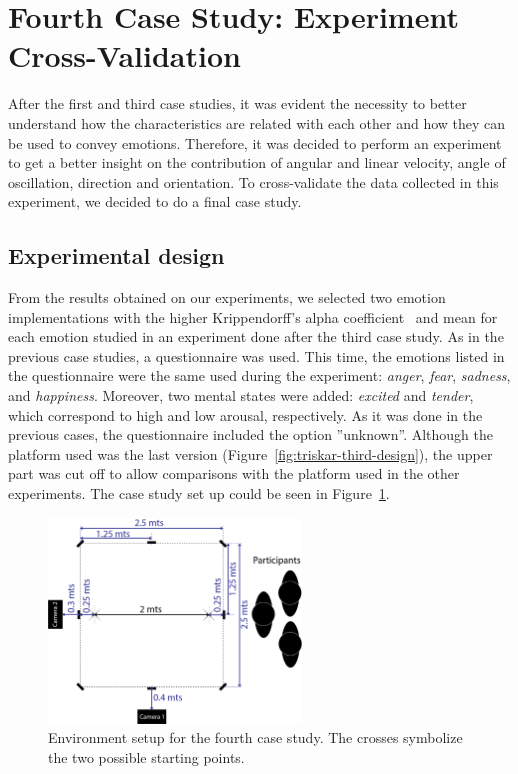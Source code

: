 \section{Fourth Case Study: Experiment Cross-Validation}

After the first and third case studies, it was evident the necessity to better understand how the characteristics are related with each other and how they can be used to convey emotions. Therefore, it was decided to perform an experiment~\cite{Angel2017} to get a better insight on the contribution of angular and linear velocity, angle of oscillation, direction and orientation. To cross-validate the data collected in this experiment, we decided to do a final case study.

\subsection{Experimental design}

From the results obtained on our experiments, we selected two emotion implementations with the higher Krippendorff's alpha coefficient~\cite{Klaus2007} and mean for each emotion studied in an experiment done after the third case study. As in the previous case studies, a questionnaire was used. This time, the emotions listed in the questionnaire were the same used during the experiment: \textit{anger}, \textit{fear}, \textit{sadness}, and \textit{happiness}. Moreover, two mental states were added: \textit{excited} and \textit{tender}, which correspond to high and low arousal, respectively. As it was done in the previous cases, the questionnaire included the option ''unknown''. Although the platform used was the last version (Figure~\ref{fig:triskar-third-design}), the upper part was cut off to allow comparisons with the platform used in the other experiments. The case study set up could be seen in Figure~\ref{fig:setup_fourth}.

\begin{figure}[h]
	\centering
	\includegraphics[width=0.60\textwidth]{./Images/FourthCase.png} 
	\caption{Environment setup for the fourth case study. The crosses symbolize the two possible starting points.}
	\label{fig:setup_fourth}
\end{figure}
 
